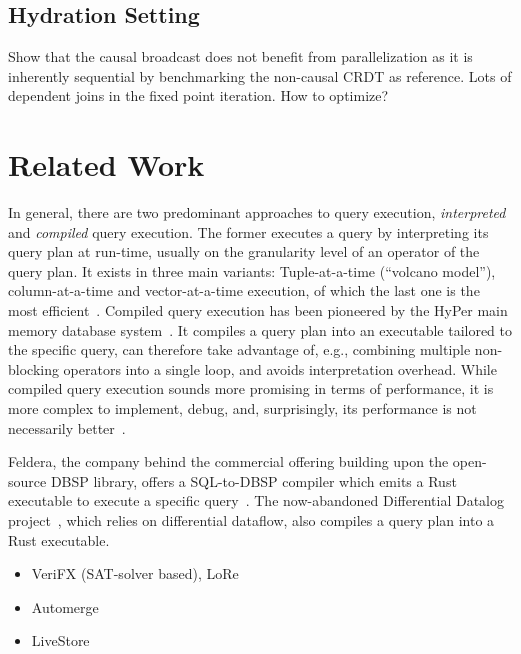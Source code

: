 \subsection{Hydration Setting}\label{sec:hydration-benchmark}

Show that the causal broadcast does not benefit from parallelization
as it is inherently sequential by benchmarking the non-causal CRDT
as reference.
Lots of dependent joins in the fixed point iteration. How to optimize?

\section{Related Work}\label{sec:related-work}

In general, there are two predominant approaches to query execution,
\emph{interpreted} and \emph{compiled} query execution.
The former executes a query by interpreting its query plan at run-time,
usually on the granularity level of an operator of the query plan.
It exists in three main variants: Tuple-at-a-time (``volcano model''),
column-at-a-time and vector-at-a-time execution,
of which the last one is the most efficient~\cite{zukowski2005monetdb}.
Compiled query execution has been pioneered by the HyPer main memory database
system~\cite{neumann2011efficiently}.
It compiles a query plan into an executable tailored to the specific query,
can therefore take advantage of, e.g., combining multiple non-blocking operators
into a single loop, and avoids interpretation overhead.
While compiled query execution sounds more promising in terms of performance,
it is more complex to implement, debug, and, surprisingly, its performance
is not necessarily better~\cite{kersten2018everything}.

Feldera, the company behind the commercial offering building upon the
open-source DBSP library, offers a SQL-to-DBSP compiler which emits
a Rust executable to execute a specific query~\cite{feldera}.
The now-abandoned Differential Datalog project~\cite{ddlog}, which relies on
differential dataflow, also compiles a query plan into a Rust executable.

\begin{itemize}
	\item VeriFX (SAT-solver based), LoRe
	\item Automerge
	\item LiveStore
\end{itemize}
